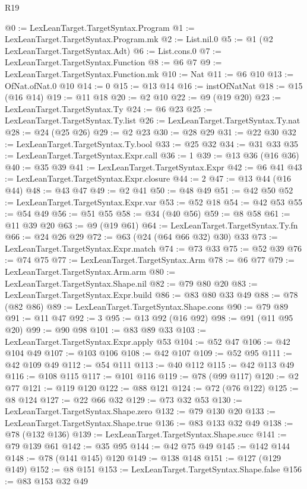 \begin{lexlean}{R19}
\begin{coremodule}
{{{{{{{{{{{{{{@0 := LexLeanTarget.TargetSyntax.Program
@1 := LexLeanTarget.TargetSyntax.Program.mk
@2 := List.nil.{0}
@5 := @1 (@2 LexLeanTarget.TargetSyntax.Adt)
@6 := List.cons.{0}
@7 := LexLeanTarget.TargetSyntax.Function
@8 := @6 @7
@9 := LexLeanTarget.TargetSyntax.Function.mk
@10 := Nat
@11 := @6 @10
@13 := OfNat.ofNat.{0} @10
@14 := 0
@15 := @13 @14
@16 := instOfNatNat
@18 := @15 (@16 @14)
@19 := @11 @18
@20 := @2 @10
@22 := @9 (@19 @20)
@23 := LexLeanTarget.TargetSyntax.Ty
@24 := @6 @23
@25 := LexLeanTarget.TargetSyntax.Ty.list
@26 := LexLeanTarget.TargetSyntax.Ty.nat
@28 := @24 (@25 @26)
@29 := @2 @23
@30 := @28 @29
@31 := @22 @30
@32 := LexLeanTarget.TargetSyntax.Ty.bool
@33 := @25 @32
@34 := @31 @33
@35 := LexLeanTarget.TargetSyntax.Expr.call
@36 := 1
@39 := @13 @36 (@16 @36)
@40 := @35 @39
@41 := LexLeanTarget.TargetSyntax.Expr
@42 := @6 @41
@43 := LexLeanTarget.TargetSyntax.Expr.closure
@44 := 2
@47 := @13 @44 (@16 @44)
@48 := @43 @47
@49 := @2 @41
@50 := @48 @49
@51 := @42 @50
@52 := LexLeanTarget.TargetSyntax.Expr.var
@53 := @52 @18
@54 := @42 @53
@55 := @54 @49
@56 := @51 @55
@58 := @34 (@40 @56)
@59 := @8 @58
@61 := @11 @39 @20
@63 := @9 (@19 @61)
@64 := LexLeanTarget.TargetSyntax.Ty.fn
@66 := @24 @26 @29
@72 := @63 (@24 (@64 @66 @32) @30) @33
@73 := LexLeanTarget.TargetSyntax.Expr.match
@74 := @73 @33
@75 := @52 @39
@76 := @74 @75
@77 := LexLeanTarget.TargetSyntax.Arm
@78 := @6 @77
@79 := LexLeanTarget.TargetSyntax.Arm.arm
@80 := LexLeanTarget.TargetSyntax.Shape.nil
@82 := @79 @80 @20
@83 := LexLeanTarget.TargetSyntax.Expr.build
@86 := @83 @80 @33 @49
@88 := @78 (@82 @86)
@89 := LexLeanTarget.TargetSyntax.Shape.cons
@90 := @79 @89
@91 := @11 @47
@92 := 3
@95 := @13 @92 (@16 @92)
@98 := @91 (@11 @95 @20)
@99 := @90 @98
@101 := @83 @89 @33
@103 := LexLeanTarget.TargetSyntax.Expr.apply @53
@104 := @52 @47
@106 := @42 @104 @49
@107 := @103 @106
@108 := @42 @107
@109 := @52 @95
@111 := @42 @109 @49
@112 := @54 @111
@113 := @40 @112
@115 := @42 @113 @49
@116 := @108 @115
@117 := @101 @116
@119 := @78 (@99 @117)
@120 := @2 @77
@121 := @119 @120
@122 := @88 @121
@124 := @72 (@76 @122)
@125 := @8 @124
@127 := @22 @66 @32
@129 := @73 @32 @53
@130 := LexLeanTarget.TargetSyntax.Shape.zero
@132 := @79 @130 @20
@133 := LexLeanTarget.TargetSyntax.Shape.true
@136 := @83 @133 @32 @49
@138 := @78 (@132 @136)
@139 := LexLeanTarget.TargetSyntax.Shape.succ
@141 := @79 @139 @61
@142 := @35 @95
@144 := @42 @75 @49
@145 := @142 @144
@148 := @78 (@141 @145) @120
@149 := @138 @148
@151 := @127 (@129 @149)
@152 := @8 @151
@153 := LexLeanTarget.TargetSyntax.Shape.false
@156 := @83 @153 @32 @49
}}}}}}}}}}}}}}
\end{coremodule}
\end{lexlean}
